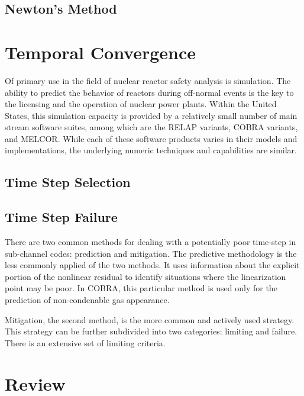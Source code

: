 \subsection{Newton's Method}
\label{subsect:newtons_method}

\section{Temporal Convergence}
\label{sect:temporal_convergence}
Of primary use in the field of nuclear reactor safety analysis is simulation.
The ability to predict the behavior of reactors during off-normal events is the key to the licensing and the operation of nuclear power plants.
Within the United States, this simulation capacity is provided by a relatively small number of main stream software suites, among which are the RELAP variants, COBRA variants, and MELCOR.
While each of these software products varies in their models and implementations, the underlying numeric techniques and capabilities are similar.

\subsection{Time Step Selection}
\label{subsect:time_step_selection}

\subsection{Time Step Failure}
\label{subsect:time_step_failure}
There are two common methods for dealing with a potentially poor time-step in sub-channel codes: prediction and mitigation.
The predictive methodology is the less commonly applied of the two methods.
It uses information about the explicit portion of the nonlinear residual to identify situations where the linearization point may be poor.
In COBRA, this particular method is used only for the prediction of non-condenable gas appearance.

Mitigation, the second method, is the more common and actively used strategy.
This strategy can be further subdivided into two categories: limiting and failure.
There is an extensive set of limiting criteria.

\section{Review}
\label{sect:review}

